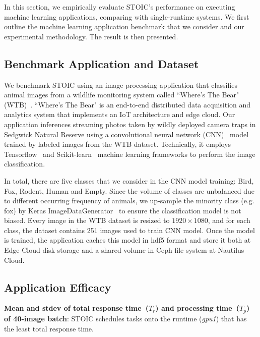 In this section, we empirically evaluate STOIC's performance on executing machine learning applications, comparing with single-runtime systems. We first outline the machine learning application benchmark that we consider and our experimental methodology. The result is then presented.

\subsection{Benchmark Application and Dataset}

We benchmark STOIC using an image processing application that classifies animal images from a wildlife monitoring system called ``Where's The Bear" (WTB)~\cite{ref:wtb}. ``Where's The Bear" is an end-to-end distributed data acquisition and analytics system that implements an IoT architecture and edge cloud. Our application inferences streaming photos taken by wildly deployed camera traps in Sedgwick Natural Reserve using a convolutional neural network (CNN)~\cite{ref:cnn} model trained by labeled images from the WTB dataset. Technically, it employs Tensorflow~\cite{ref:tensorflow} and Scikit-learn~\cite{ref:scikit} machine learning frameworks to perform the image classification.  

 In total, there are five classes that we consider in the CNN model training: Bird, Fox, Rodent, Human and Empty. Since the volume of classes are unbalanced due to different occurring frequency of animals, we up-sample the minority class (e.g. fox) by Keras ImageDataGenerator~\cite{ref:keras} to ensure the classification model is not biased. Every image in the WTB dataset is resized to $1920 \times 1080$, and for each class, the dataset contains 251 images used to train CNN model. Once the model is trained, the application caches this model in hdf5 format and store it both at Edge Cloud disk storage and a shared volume in Ceph file system at Nautilus Cloud. 

\subsection{Application Efficacy}

\begin{table}[t] \centering 

\caption{\textbf{Mean and stdev of total response time~($T_r$) and processing time~($T_p$) of 40-image batch}: STOIC schedules tasks onto the runtime (\textit{gpu1}) that has the least total response time.
\label{tab:validation}}
\end{table}

